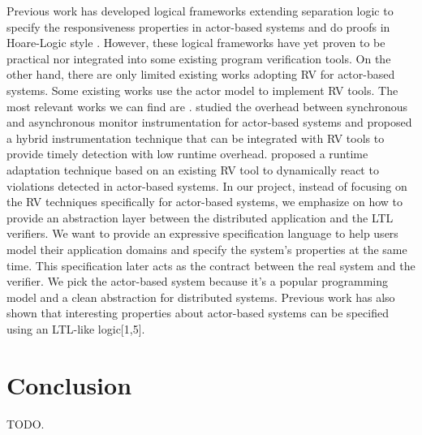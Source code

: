 \documentclass[format=acmsmall, nonacm=true, review=true, screen=true]{acmart}
\begin{document}
Previous work has developed logical frameworks extending separation logic to specify the responsiveness properties in actor-based systems and do proofs in Hoare-Logic style \cite{actorservice, parthasarathy2018modular}.
However, these logical frameworks have yet proven to be practical nor integrated into some existing program verification tools.
On the other hand, there are only limited existing works adopting RV for actor-based systems.
Some existing works \cite{shafiei2020actor,lavery2017actor} use the actor model to implement RV tools.
The most relevant works we can find are \cite{cassar2015synchronous,cassar2015runtime}.
\cite{cassar2015synchronous} studied the overhead between synchronous and asynchronous monitor instrumentation for actor-based systems and proposed a hybrid instrumentation technique that can be  integrated with RV tools to provide timely detection with low runtime overhead.
\cite{cassar2015runtime} proposed a runtime adaptation technique based on an existing RV tool to dynamically react to violations detected in actor-based systems.
In our project, instead of focusing on the RV techniques specifically for actor-based systems, we emphasize on how to provide an abstraction layer between the distributed application and the LTL verifiers.
We want to provide an expressive specification language to help users model their application domains and specify the system's properties at the same time. This specification later acts as the contract between the real system and the verifier.
We pick the actor-based system because it's a popular programming model and a clean abstraction for distributed systems.
Previous work has also shown that interesting properties about actor-based systems can be specified using an LTL-like logic[1,5].

\section{Conclusion}

TODO.

\pagebreak



\end{document}
